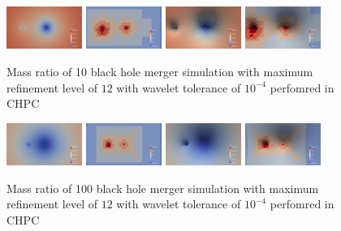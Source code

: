 \begin{figure}[H]
    \centering
    \includegraphics[width=0.22\textwidth]{figs/paraview/r10/img_slice_000050.png}
    \includegraphics[width=0.22\textwidth]{figs/paraview/r10/img_slice_level_000050.png}
    \includegraphics[width=0.22\textwidth]{figs/paraview/r10/img_slice_wbs_000050.png}
    \includegraphics[width=0.22\textwidth]{figs/paraview/r10/img_slice_level_wbs_000050.png}
    \caption{Mass ratio of 10 black hole merger simulation with maximum refinement level of $12$ with wavelet tolerance of $10^{-4}$ perfomred in CHPC \label{fig:pv:r10}}
\end{figure}


\begin{figure}[H]
    \centering
    \includegraphics[width=0.22\textwidth]{figs/paraview/r100/img_slice_000050.png}
    \includegraphics[width=0.22\textwidth]{figs/paraview/r100/img_slice_level_000050.png}
    \includegraphics[width=0.22\textwidth]{figs/paraview/r100/img_slice_wbs_000050.png}
    \includegraphics[width=0.22\textwidth]{figs/paraview/r100/img_slice_level_wbs_000050.png}
    \caption{Mass ratio of 100 black hole merger simulation with maximum refinement level of $12$ with wavelet tolerance of $10^{-4}$ perfomred in CHPC \label{fig:pv:r100}}
\end{figure}



